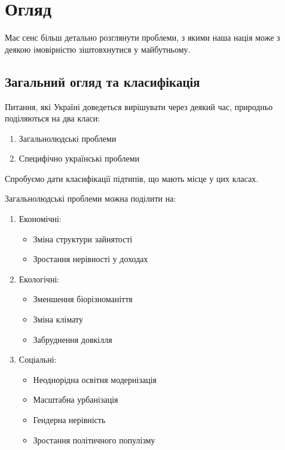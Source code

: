 \chapter{Огляд}
\label{chap:distributedcomputation}

Має сенс більш детально розглянути проблеми, з якими наша нація може з деякою
імовірністю зіштовхнутися у майбутньому.

\pagestyle{plain}

    \section{Загальний огляд та класифікація}\label{sec:general}
        Питання, які Україні доведеться вирішувати через деякий час, природньо поділяються на два класи:

        \begin{enumerate}
            \item Загальнолюдські проблеми
            \item Специфічно українські проблеми
        \end{enumerate}
        
        Спробуємо дати класифікації підтипів, що мають місце у цих класах. 

        Загальнолюдські проблеми можна поділити на:

        \begin{enumerate}
            \item Економічні:
            \begin{itemize}
                \item Зміна структури зайнятості
                \item Зростання нерівності у доходах
            \end{itemize}

            \item Екологічні:
            \begin{itemize}
                \item Зменшення біорізноманіття
                \item Зміна клімату
                \item Забруднення довкілля
            \end{itemize}

            \item Соціальні:
            \begin{itemize}
                \item Неоднорідна освітня модернізація
                \item Масштабна урбанізація
                \item Гендерна нерівність
                \item Зростання політичного популізму
            \end{itemize}
        \end{enumerate}

